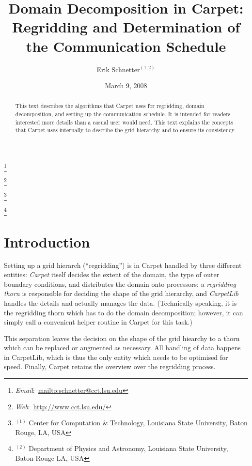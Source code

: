 \documentclass[oneside]{amsart}
\begin{document}
\title[Domain Decomposition in Carpet]{Domain Decomposition in
  Carpet:\\Regridding and Determination of the Communication Schedule}

\author{Erik Schnetter$^{(1,2)}$}

\thanks{\emph{Email}:~\url{mailto:schnetter@cct.lsu.edu}}

\thanks{\emph{Web}:~\url{http://www.cct.lsu.edu/}}

\thanks{{}$^{(1)}$ Center for Computation \& Technology,
  Louisiana State University, Baton Rouge, LA, USA}

\thanks{{}$^{(2)}$ Department of Physics and Astronomy,
  Louisiana State University, Baton Rouge LA, USA}



\date{March 9, 2008}



\begin{abstract}
  This text describes the algorithms that Carpet
  \cite{Schnetter-etal-03b, carpetweb} uses for regridding, domain
  decomposition, and setting up the communication schedule.  It is
  intended for readers interested more details than a casual user
  would need.  This text explains the concepts that Carpet uses
  internally to describe the grid hierarchy and to ensure its
  consistency.
\end{abstract}

\maketitle



\section{Introduction}

Setting up a grid hierarch (``regridding'') is in Carpet handled by
three different entities: \emph{Carpet} itself decides the extent of
the domain, the type of outer boundary conditions, and distributes the
domain onto processors; a \emph{regridding thorn} is responsible for
deciding the shape of the grid hierarchy, and \emph{CarpetLib} handles
the details and actually manages the data.  (Technically speaking, it
is the regridding thorn which has to do the domain decomposition;
however, it can simply call a convenient helper routine in Carpet for
this task.)

This separation leaves the decision on the shape of the grid hiearchy
to a thorn which can be replaced or augmented as necessary.  All
handling of data happens in CarpetLib, which is thus the only entity
which needs to be optimised for speed.  Finally, Carpet retains the
overview over the regridding process.
\end{document}

